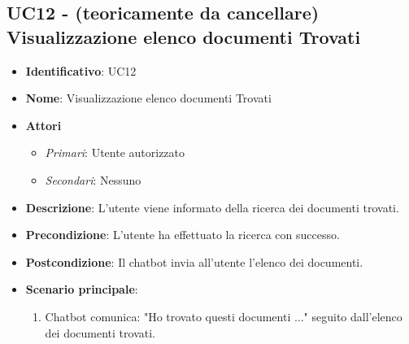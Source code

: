 \subsection{UC12 - (teoricamente da cancellare) Visualizzazione elenco documenti Trovati }
\begin{itemize}
	\item \textbf{Identificativo}: UC12
	\item \textbf{Nome}: Visualizzazione elenco documenti Trovati
	\item \textbf{Attori}
	\begin{itemize} 
		\item \textit{Primari}: Utente autorizzato
		\item \textit{Secondari}: Nessuno
	\end{itemize}
	\item \textbf{Descrizione}: L'utente viene informato della ricerca dei documenti trovati.
	\item \textbf{Precondizione}: L'utente ha effettuato la ricerca con successo.
	\item \textbf{Postcondizione}: Il chatbot invia all'utente l'elenco dei documenti.
	\item \textbf{Scenario principale}: \begin{enumerate}
		\item Chatbot comunica: "Ho trovato questi documenti ..." seguito dall'elenco dei documenti trovati.
	\end{enumerate}
\end{itemize}